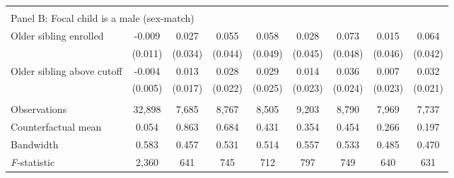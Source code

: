 {{\begin{tabular}{lcccccccc}
&  &  &  & & & & & \\
\multicolumn{10}{l}{Panel B: Focal child is a male (sex-match)} \\
Older sibling enrolled&      -0.009   &       0.027   &       0.055   &       0.058   &       0.028   &       0.073   &       0.015   &       0.064   \\
                    &     (0.011)   &     (0.034)   &     (0.044)   &     (0.049)   &     (0.045)   &     (0.048)   &     (0.046)   &     (0.042)   \\
 
Older sibling above cutoff&      -0.004   &       0.013   &       0.028   &       0.029   &       0.014   &       0.036   &       0.007   &       0.032   \\
                    &     (0.005)   &     (0.017)   &     (0.022)   &     (0.025)   &     (0.023)   &     (0.024)   &     (0.023)   &     (0.021)   \\
                    &               &               &               &               &               &               &               &               \\
Observations        &      32,898   &       7,685   &       8,767   &       8,505   &       9,203   &       8,790   &       7,969   &       7,737   \\
Counterfactual mean &       0.054   &       0.863   &       0.684   &       0.431   &       0.354   &       0.454   &       0.266   &       0.197   \\
Bandwidth           &       0.583   &       0.457   &       0.531   &       0.514   &       0.557   &       0.533   &       0.485   &       0.470   \\
\textit{F}-statistic&       2,360   &         641   &         745   &         712   &         797   &         749   &         640   &         631   \\
 

\bottomrule
\end{tabular}
}
}
